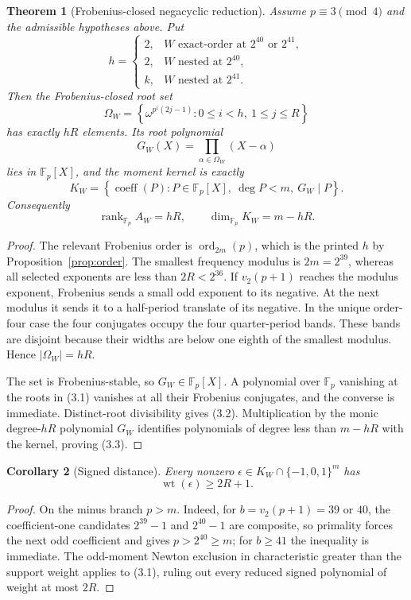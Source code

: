 \documentclass[11pt,a4paper]{amsart}
\newtheorem{theorem}{Theorem}[section]
\newtheorem{corollary}[theorem]{Corollary}
\theoremstyle{remark}
\newcommand{\F}{\mathbb F}
\newcommand{\wt}{\operatorname{wt}}
\newcommand{\ord}{\operatorname{ord}}
\begin{document}
\begin{theorem}[Frobenius-closed negacyclic reduction]\label{thm:coupled}
Assume $p\equiv3\pmod4$ and the admissible hypotheses above.  Put
\[
 h=
 \begin{cases}
  2,&W\text{ exact-order at }2^{40}\text{ or }2^{41},\\
  2,&W\text{ nested at }2^{40},\\
  k,&W\text{ nested at }2^{41}.
 \end{cases}
\]
Then the Frobenius-closed root set
\[
 \Omega_W=
 \left\{\omega^{p^i(2j-1)}:
 0\le i<h,\ 1\le j\le R\right\}
\]
has exactly $hR$ elements.  Its root polynomial
\[
 G_W(X)=\prod_{\alpha\in\Omega_W}(X-\alpha)
\]
lies in $\F_p[X]$, and the moment kernel is exactly
\[
 K_W=
 \left\{\operatorname{coeff}(P):
 P\in\F_p[X],\ \deg P<m,\ G_W\mid P\right\}.          \tag{3.2}
\]
Consequently
\[
 \operatorname{rank}_{\F_p}A_W=hR,
 \qquad
 \dim_{\F_p}K_W=m-hR.                                 \tag{3.3}
\]
\end{theorem}

\begin{proof}
The relevant Frobenius order is $\ord_{2m}(p)$, which is the printed $h$ by
Proposition~\ref{prop:order}.  The smallest frequency modulus is
$2m=2^{39}$, whereas all selected exponents are less than
$2R<2^{36}$.  If $v_2(p+1)$ reaches the modulus exponent, Frobenius sends a
small odd exponent to its negative.  At the next modulus it sends it to a
half-period translate of its negative.  In the unique order-four case the
four conjugates occupy the four quarter-period bands.  These bands are
disjoint because their widths are below one eighth of the smallest modulus.
Hence $|\Omega_W|=hR$.

The set is Frobenius-stable, so $G_W\in\F_p[X]$.  A polynomial over $\F_p$
vanishing at the roots in (3.1) vanishes at all their Frobenius conjugates,
and the converse is immediate.  Distinct-root divisibility gives (3.2).
Multiplication by the monic degree-$hR$ polynomial $G_W$ identifies
polynomials of degree less than $m-hR$ with the kernel, proving (3.3).
\end{proof}

\begin{corollary}[Signed distance]\label{cor:distance}
Every nonzero
$\epsilon\in K_W\cap\{-1,0,1\}^m$ has
\[
 \wt(\epsilon)\ge2R+1.
\]
\end{corollary}

\begin{proof}
On the minus branch $p>m$.  Indeed, for $b=v_2(p+1)=39$ or $40$, the
coefficient-one candidates $2^{39}-1$ and $2^{40}-1$ are composite, so
primality forces the next odd coefficient and gives $p>2^{40}\ge m$; for
$b\ge41$ the inequality is immediate.  The odd-moment Newton exclusion in
characteristic greater than the support weight applies to (3.1), ruling out
every reduced signed polynomial of weight at most $2R$.
\end{proof}
\end{document}
